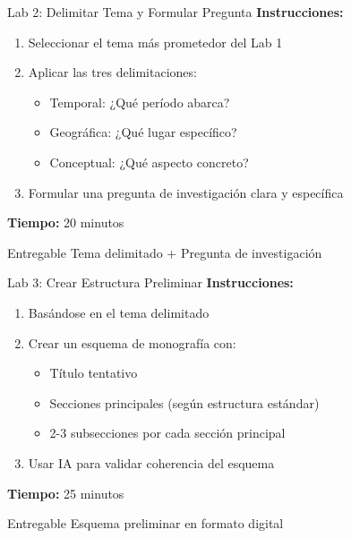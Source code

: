 \documentclass[xcolor=table,aspectratio=169,11pt]{beamer}
\begin{document}
	\begin{frame}{Lab 2: Delimitar Tema y Formular Pregunta}
		\textbf{Instrucciones:}
		\begin{enumerate}
			\item Seleccionar el tema más prometedor del Lab 1
			\item Aplicar las tres delimitaciones:
			\begin{itemize}
				\item Temporal: ¿Qué período abarca?
				\item Geográfica: ¿Qué lugar específico?
				\item Conceptual: ¿Qué aspecto concreto?
			\end{itemize}
			\item Formular una pregunta de investigación clara y específica
		\end{enumerate}
		
		\vspace{0.5cm}
		\textbf{Tiempo:} 20 minutos
		
		\vspace{0.3cm}
		\begin{alertblock}{Entregable}
			Tema delimitado + Pregunta de investigación
		\end{alertblock}
	\end{frame}
	
	\begin{frame}{Lab 3: Crear Estructura Preliminar}
		\textbf{Instrucciones:}
		\begin{enumerate}
			\item Basándose en el tema delimitado
			\item Crear un esquema de monografía con:
			\begin{itemize}
				\item Título tentativo
				\item Secciones principales (según estructura estándar)
				\item 2-3 subsecciones por cada sección principal
			\end{itemize}
			\item Usar IA para validar coherencia del esquema
		\end{enumerate}
		
		\vspace{0.5cm}
		\textbf{Tiempo:} 25 minutos
		
		\vspace{0.3cm}
		\begin{alertblock}{Entregable}
			Esquema preliminar en formato digital
		\end{alertblock}
	\end{frame}
	
\end{document}
